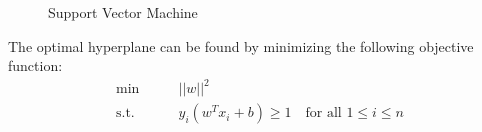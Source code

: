 \begin{figure}
	\centering
	\caption{Support Vector Machine}\label{fig:relate:svm}
\end{figure}
The optimal hyperplane can be found by minimizing the following objective function:
\begin{equation}
\begin{aligned}
\min \qquad & ||w||^2\\
\text{s.t.}\qquad & y_i(w^Tx_i+b) \geq 1 \quad \text{for all } 1\leq i \leq n
\end{aligned}
\end{equation}
